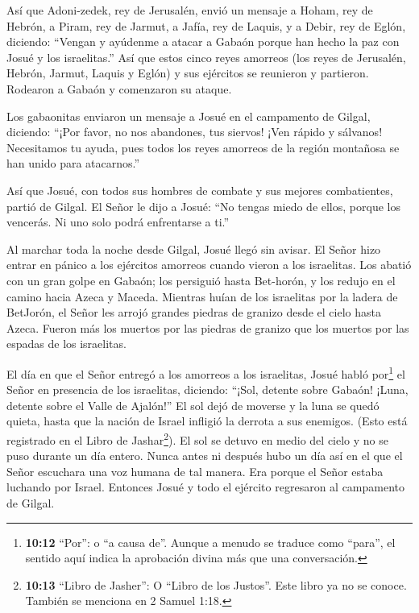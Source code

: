  Así que Adoni-zedek, rey de Jerusalén, envió un mensaje a
Hoham, rey de Hebrón, a Piram, rey de Jarmut, a Jafía, rey de Laquis, y
a Debir, rey de Eglón, diciendo:  ``Vengan y ayúdenme a
atacar a Gabaón porque han hecho la paz con Josué y los israelitas.''
 Así que estos cinco reyes amorreos (los reyes de Jerusalén,
Hebrón, Jarmut, Laquis y Eglón) y sus ejércitos se reunieron y
partieron. Rodearon a Gabaón y comenzaron su ataque.

 Los gabaonitas enviaron un mensaje a Josué en el campamento
de Gilgal, diciendo: ``¡Por favor, no nos abandones, tus siervos! ¡Ven
rápido y sálvanos! Necesitamos tu ayuda, pues todos los reyes amorreos
de la región montañosa se han unido para atacarnos.''

 Así que Josué, con todos sus hombres de combate y sus
mejores combatientes, partió de Gilgal.  El Señor le dijo a
Josué: ``No tengas miedo de ellos, porque los vencerás. Ni uno solo
podrá enfrentarse a ti.''

 Al marchar toda la noche desde Gilgal, Josué llegó sin
avisar.  El Señor hizo entrar en pánico a los ejércitos
amorreos cuando vieron a los israelitas. Los abatió con un gran golpe en
Gabaón; los persiguió hasta Bet-horón, y los redujo en el camino hacia
Azeca y Maceda.  Mientras huían de los israelitas por la
ladera de BetJorón, el Señor les arrojó grandes piedras de granizo desde
el cielo hasta Azeca. Fueron más los muertos por las piedras de granizo
que los muertos por las espadas de los israelitas.

 El día en que el Señor entregó a los amorreos a los
israelitas, Josué habló por\footnote{\textbf{10:12} ``Por'': o ``a causa
  de''. Aunque a menudo se traduce como ``para'', el sentido aquí indica
  la aprobación divina más que una conversación.} el Señor en presencia
de los israelitas, diciendo: ``¡Sol, detente sobre Gabaón! ¡Luna,
detente sobre el Valle de Ajalón!''  El sol dejó de moverse
y la luna se quedó quieta, hasta que la nación de Israel infligió la
derrota a sus enemigos. (Esto está registrado en el Libro de
Jashar\footnote{\textbf{10:13} ``Libro de Jasher'': O ``Libro de los
  Justos''. Este libro ya no se conoce. También se menciona en 2 Samuel
  1:18.}). El sol se detuvo en medio del cielo y no se puso durante un
día entero.  Nunca antes ni después hubo un día así en el
que el Señor escuchara una voz humana de tal manera. Era porque el Señor
estaba luchando por Israel.  Entonces Josué y todo el
ejército regresaron al campamento de Gilgal.

